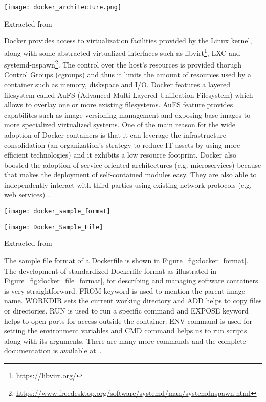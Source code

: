 \begin{center}
\texttt{[image: docker\_architecture.png]}
\label{fig:docker_architecture}
\caption*{Extracted from \cite{docker-documentation}}
\end{center}


Docker provides access to virtualization facilities provided by the Linux kernel, along with some abstracted virtualized interfaces such as libvirt\footnote{\url{https://libvirt.org/}}, LXC and systemd-nspawn\footnote{\url{https://www.freedesktop.org/software/systemd/man/systemdnspawn.html}}. The control over the host's resources is provided thorugh Control Groups (cgroups) and thus it limits the amount of resources used by a container such as memory, diskspace and I/O. Docker features a layered filesystem called AuFS (Advanced Multi Layered Unification Filesystem) which allows to overlay one or more existing filesystems. AuFS feature provides capabilites such as image versioning management and exposing base images to more specialized virtualized systems. One of the main reason for the wide adoption of Docker containers is that it can leverage the infrastructure consolidation (an organization's strategy to reduce IT assets by using more efficient technologies) and it exhibits a low resource footprint. Docker also boosted the adoption of service oriented architectures (e.g. microservices) because that makes the deployment of self-contained modules easy. They are also able to independently interact with third parties using existing network protocols (e.g. web services)~\cite{Xavier:2013:PEC:2497369.2497577}. 

\begin{center}
\texttt{[image: docker\_sample\_format]}
\label{fig:docker_format}
\end{center}

\begin{center}
\texttt{[image: Docker\_Sample\_File]}
\label{fig:docker_file_format}
\caption*{Extracted from \cite{docker-file-format}}
\end{center}

The sample file format of a Dockerfile is shown in Figure~\ref{fig:docker_format}. The development of standardized Dockerfile format as illustrated in Figure~\ref{fig:docker_file_format}, for describing and managing software containers is very straightforward. FROM keyword is used to mention the parent image name. WORKDIR sets the current working directory and ADD helps to copy files or directories. RUN is used to run a specific command and EXPOSE keyword helps to open ports for access outside the container. ENV command is used for setting the environment variables and CMD command helps us to run scripts along with its arguments. There are many more commands and the complete documentation is available at~\cite{docker_commands}.

